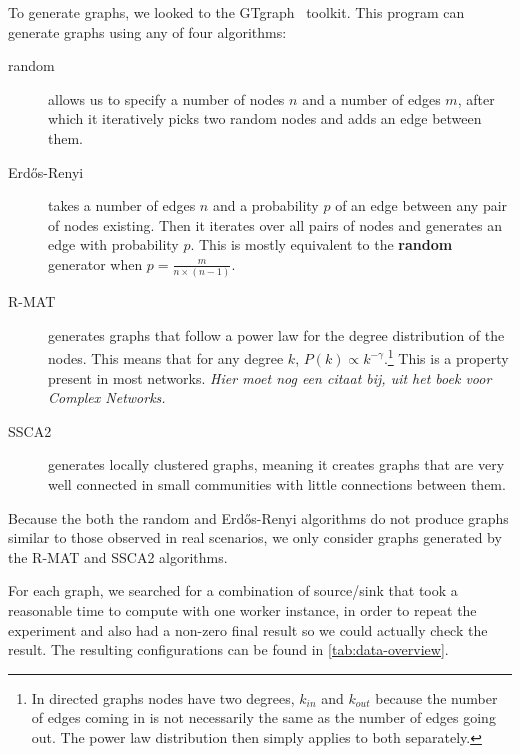 To generate graphs, we looked to the GTgraph~\cite{bader2006gtgraph} toolkit. This program can generate graphs using any of four algorithms:
\begin{description}
    \item[random] allows us to specify a number of nodes $n$ and a number of edges $m$, after which it iteratively picks two random nodes and adds an edge between them.

    \item[Erd\H{o}s-Renyi] takes a number of edges $n$ and a probability $p$ of an edge between any pair of nodes existing. Then it iterates over all pairs of nodes and generates an edge with probability $p$. This is mostly equivalent to the \textbf{random} generator when $p = \frac{m}{n \times (n - 1)}$.

    \item[R-MAT] generates graphs that follow a power law for the degree distribution of the nodes. This means that for any degree $k$, $P(k) \propto k^{-\gamma}$.\footnote{In directed graphs nodes have two degrees, $k_{in}$ and $k_{out}$ because the number of edges coming in is not necessarily the same as the number of edges going out. The power law distribution then simply applies to both separately.} This is a property present in most networks. \emph{Hier moet nog een citaat bij, uit het boek voor Complex Networks.}
    
    \item[SSCA2] generates locally clustered graphs, meaning it creates graphs that are very well connected in small communities with little connections between them.
\end{description}

Because the both the random and Erd\H{o}s-Renyi algorithms do not produce graphs similar to those observed in real scenarios, we only consider graphs generated by the R-MAT and SSCA2 algorithms.

For each graph, we searched for a combination of source/sink that took a reasonable time to compute with one worker instance, in order to repeat the experiment and also had a non-zero final result so we could actually check the result. The resulting configurations can be found in \autoref{tab:data-overview}.

